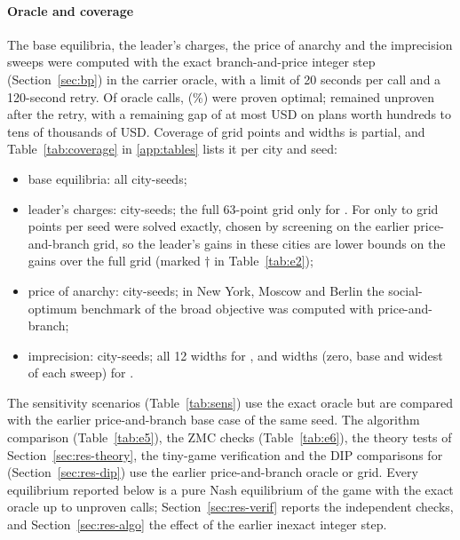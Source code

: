 \documentclass[preprint,12pt]{elsarticle}
\theoremstyle{definition}
\theoremstyle{remark}
\begin{document}
\paragraph{Oracle and coverage} The base equilibria, the leader's charges, the price of anarchy and the imprecision sweeps were computed with the exact branch-and-price integer step (Section~\ref{sec:bp}) in the carrier oracle, with a limit of 20 seconds per call and a 120-second retry. Of \ExCalls{} oracle calls, \ExOptimal{} (\ExProvenPct\%) were proven optimal; \ExUnproven{} remained unproven after the retry, with a remaining gap of at most \ExMaxGap{} USD on plans worth hundreds to tens of thousands of USD. Coverage of grid points and widths is partial, and Table~\ref{tab:coverage} in \ref{app:tables} lists it per city and seed:
\begin{itemize}[leftmargin=*]
\item base equilibria: all \ExEoneN{} city-seeds;
\item leader's charges: \ExEtwoN{} city-seeds; the full 63-point grid only for \ExEtwoFullCities. For \ExEtwoRedCities{} only \ExEtwoRedMin{} to \ExEtwoRedMax{} grid points per seed were solved exactly, chosen by screening on the earlier price-and-branch grid, so the leader's gains in these cities are lower bounds on the gains over the full grid (marked $\dagger$ in Table~\ref{tab:e2});
\item price of anarchy: \ExEthreeN{} city-seeds\ExEthreeMissingClause; in New York, Moscow and Berlin the social-optimum benchmark of the broad objective was computed with price-and-branch;
\item imprecision: \ExEfourN{} city-seeds; all 12 widths for \ExEfourFullCities, and \ExEfourRedWidths{} widths (zero, base and widest of each sweep) for \ExEfourRedCities\ExEfourMissingClause.
\end{itemize}
The sensitivity scenarios (Table~\ref{tab:sens}) use the exact oracle but are compared with the earlier price-and-branch base case of the same seed. The algorithm comparison (Table~\ref{tab:e5}), the ZMC checks (Table~\ref{tab:e6}), the theory tests of Section~\ref{sec:res-theory}, the tiny-game verification and the DIP comparisons for \DipPbCases{} (Section~\ref{sec:res-dip}) use the earlier price-and-branch oracle or grid. Every equilibrium reported below is a pure Nash equilibrium of the game with the exact oracle up to unproven calls; Section~\ref{sec:res-verif} reports the independent checks, and Section~\ref{sec:res-algo} the effect of the earlier inexact integer step.
\end{document}
